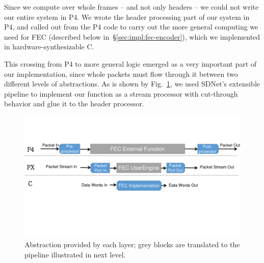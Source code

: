 %
%

         
Since we compute over whole frames -- and not only headers -- we could
not write our entire system in P4. We wrote the header processing part of our
system in P4, and called out from the P4 code to carry out the more general
computing we need for FEC (described below in~\S\ref{sec:impl:fec-encoder}),
which we implemented in hardware-synthesizable C.

This crossing from P4 to more general logic emerged as a very important part of our implementation,
since whole packets must flow through it between two different levels
of abstractions.
As is shown by Fig.~\ref{fig:sdnet-interface}, we used SDNet's extensible pipeline to implement
our function as a stream processor with cut-through behavior and glue it
to the header processor.

\begin{figure}
  \centering
  \includegraphics[width=0.4\paperwidth]{figures/sdnet-interface.pdf}
  \caption{\label{fig:sdnet-interface}Abstraction provided by each layer; grey blocks are translated to the pipeline illustrated in next level.}
\end{figure}

